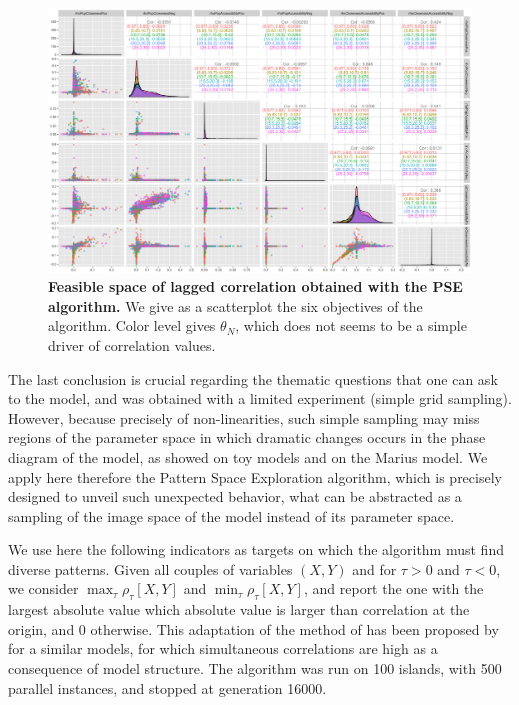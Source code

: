 \begin{figure}
	\includegraphics[width=\textwidth]{figures/scatterplot_colornwThreshold.png}
	\caption{\textbf{Feasible space of lagged correlation obtained with the PSE algorithm.} We give as a scatterplot the six objectives of the algorithm. Color level gives $\theta_N$, which does not seems to be a simple driver of correlation values.\label{fig:pse}}
\end{figure}


The last conclusion is crucial regarding the thematic questions that one can ask to the model, and was obtained with a limited experiment (simple grid sampling). However, because precisely of non-linearities, such simple sampling may miss regions of the parameter space in which dramatic changes occurs in the phase diagram of the model, as \cite{cherel2015beyond} showed on toy models and on the Marius model. We apply here therefore the Pattern Space Exploration algorithm, which is precisely designed to unveil such unexpected behavior, what can be abstracted as a sampling of the image space of the model instead of its parameter space.

We use here the following indicators as targets on which the algorithm must find diverse patterns. Given all couples of variables $(X,Y)$ and for $\tau > 0$ and $\tau < 0$, we consider $\max_{\tau} \rho_{\tau}\left[X,Y\right]$ and $\min_{\tau} \rho_{\tau}\left[X,Y\right]$, and report the one with the largest absolute value which absolute value is larger than correlation at the origin, and 0 otherwise. This adaptation of the method of \cite{raimbault2017identification} has been proposed by \cite{2018arXiv180409430R} for a similar models, for which simultaneous correlations are high as a consequence of model structure. The algorithm was run on 100 islands, with 500 parallel instances, and stopped at generation 16000.



